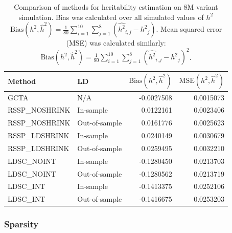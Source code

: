 \begin{table}
\begin{tabular}{l|l|r|r}
\hline
Method & LD & $\text{Bias}(h^2,\hat{h}^2)$ & $\text{MSE}(h^2,\hat{h}^2)$\\
\hline
GCTA & N/A & -0.0027508 & 0.0015073\\
\hline
RSSP\_NOSHRINK & In-sample & 0.0122161 & 0.0023406\\
\hline
RSSP\_NOSHRINK & Out-of-sample & 0.0161776 & 0.0025623\\
\hline
RSSP\_LDSHRINK & In-sample & 0.0240149 & 0.0030679\\
\hline
RSSP\_LDSHRINK & Out-of-sample & 0.0259495 & 0.0032210\\
\hline
LDSC\_NOINT & In-sample & -0.1280450 & 0.0213703\\
\hline
LDSC\_NOINT & Out-of-sample & -0.1280562 & 0.0213719\\
\hline
LDSC\_INT & In-sample & -0.1413375 & 0.0252106\\
\hline
LDSC\_INT & Out-of-sample & -0.1416675 & 0.0253203\\
\hline
\end{tabular}\label{tab:gwas_sim_ave_error}
\caption{Comparison of methods for heritability estimation on 8M variant simulation.  Bias was calculated over all simulated values of $h^2$ $\text{Bias}(h^2,\hat{h}^2)=\frac{1}{80}\sum_{i=1}^{10}\sum_{j=1}^{8}(\hat{h^2}_{i,j}-{h^2}_j)$.   Mean squared error (MSE) was calculated similarly: $\text{Bias}(h^2,\hat{h}^2)=\frac{1}{80}\sum_{i=1}^{10}\sum_{j=1}^{8}{(\hat{h^2}_{i,j}-{h^2}_j)}^2$.}
\end{table}

\subsubsection{Sparsity}

